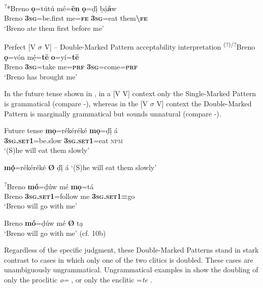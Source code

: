 \documentclass[output=paper]{langsci/langscibook}
\begin{document}
\ex\label{ex:rolle:26}
\gll   \textsuperscript{?}*Breno   \textbf{ọ}=tútú     mé=\textbf{ēn}  \textbf{ọ}=ḍị́   ḅạ́\textbf{ā}w\\
         Breno  \textbf{\textsc{3sg}}=be.first  me=\textbf{\textsc{fe}}   \textbf{\textsc{3sg}}=eat  them\textbf{{\textbackslash}}\textbf{\textsc{fe}}\\
\glt ‘Breno ate them first before me’
\z
\z 

\ea\label{ex:rolle:27}
{Perfect [V $\sigma $ V] – Double-Marked Pattern acceptability interpretation}
\gll  \textsuperscript{(?)/?}Breno   \textbf{ọ}=vón     mẹ́=\textbf{t\=e}     \textbf{o}=yí=\textbf{t\=e}\\
       Breno   \textbf{\textsc{3sg}}=take   me=\textbf{\textsc{prf}} \textbf{\textsc{3sg}}=come=\textbf{\textsc{prf}}\\
\glt ‘Breno has brought me’ 
\z

In the future tense shown in , in a [V V] context only the Single-Marked Pattern is grammatical (compare -), whereas in the [V $\sigma $ V] context the Double-Marked Pattern is marginally grammatical but sounds unnatural (compare -). 

\ea\label{ex:rolle:fut} {Future tense}
   \ea\label{ex:rolle:28}
\gll   *\textbf{mọ}=rékéréké    \textbf{mọ}=ḍị́       á    \\
     \textbf{\textsc{3sg.set1}}=be.slow  \textbf{\textsc{3sg}}\textbf{.}\textbf{\textsc{set1}}=eat  \textsc{npm}\\
\glt ‘(S)he will eat them slowly’

\ex\label{ex:rolle:29}
 \textbf{mọ́}=rékéréké \textbf{Ø} ḍị́ á 
\glt ‘(S)he will eat them slowly’

\ex\label{ex:rolle:30}
\gll   \textsuperscript{?}Breno  \textbf{mó}=ḍúw    mé   \textbf{mọ}=tá    \\
     Breno     \textbf{\textsc{3sg.set1}}=follow  me  \textbf{\textsc{3sg.set1=}}go\\
\glt ‘Breno will go with me’

\ex\label{ex:rolle:31}
   Breno \textbf{mó}=ḍúw mé \textbf{Ø} tạ\\
\glt ‘Breno will go with me’ (cf. 10b)
\z
\z 

Regardless of the specific judgment, these Double-Marked Patterns stand in stark contrast to cases in which only one of the two clitics is doubled. These cases are unambiguously ungrammatical. Ungrammatical examples in  show the doubling of only the proclitic \textit{o=} , or only the enclitic =\textit{te} . 
\end{document}
